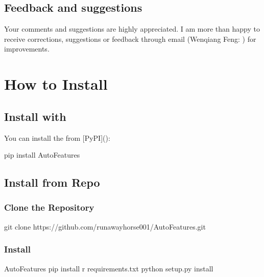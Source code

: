 \documentclass[letterpaper,11pt,english]{sphinxmanual}
\begin{document}
\subsection{Feedback and suggestions}
\label{\detokenize{preface:feedback-and-suggestions}}
Your comments and suggestions are highly appreciated. I am more than happy to receive
corrections, suggestions or feedback through email (Wenqiang Feng: ) for improvements.


\section{How to Install}
\label{\detokenize{install:how-to-install}}\label{\detokenize{install:install}}\label{\detokenize{install::doc}}

\subsection{Install with }
\label{\detokenize{install:install-with-pip}}
You can install the  from {[}PyPI{]}():

\begin{sphinxVerbatim}[commandchars=\\\{\}]
pip install AutoFeatures
\end{sphinxVerbatim}


\subsection{Install from Repo}
\label{\detokenize{install:install-from-repo}}

\subsubsection{Clone the Repository}
\label{\detokenize{install:clone-the-repository}}
\begin{sphinxVerbatim}[commandchars=\\\{\}]
git clone https://github.com/runawayhorse001/AutoFeatures.git
\end{sphinxVerbatim}


\subsubsection{Install}
\label{\detokenize{install:id1}}
\begin{sphinxVerbatim}[commandchars=\\\{\}]
 AutoFeatures
pip install \PYGZhy{}r requirements.txt
python setup.py install
\end{sphinxVerbatim}
\end{document}
